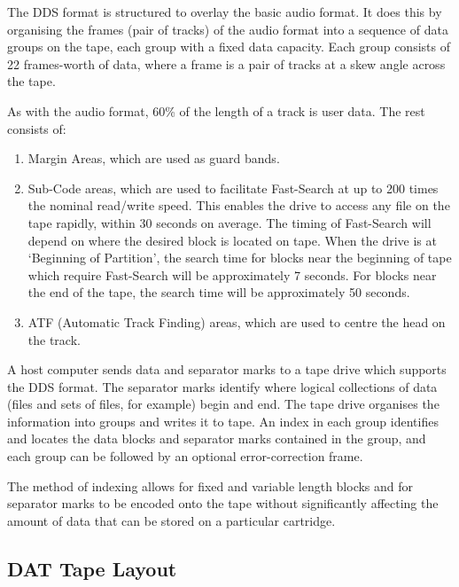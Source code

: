 \documentclass[11pt]{article}
\begin{document}
The DDS format is structured to overlay the basic audio format. It does this
by organising the frames (pair of tracks) of the audio format into a
sequence of data groups on the tape, each group with a fixed data capacity.
Each group consists of 22 frames-worth of data, where a frame is a pair of
tracks at a skew angle across the tape.

As with the audio format, 60\% of the length of a track is user data. The
rest consists of:

\begin {enumerate}

\item Margin Areas, which are used as guard bands.

\item Sub-Code areas, which are used to facilitate Fast-Search at up to 200
times the nominal read/write speed. This enables the drive to access any
file on the tape rapidly, within 30 seconds on average. The timing of
Fast-Search will depend on where the desired block is located on tape.
When the drive is at `Beginning of Partition', the search time for blocks
near the beginning of tape which require Fast-Search will be approximately
7 seconds. For blocks near the end of the tape, the search time will be
approximately 50 seconds.

\item ATF (Automatic Track Finding) areas, which are used to centre the head
on the track.

\end {enumerate}

A host computer sends data and separator marks to a tape drive which
supports the DDS format. The separator marks identify where logical
collections of data (files and sets of files, for example) begin and end.
The tape drive organises the information into groups and writes it to tape.
An index in each group identifies and locates the data blocks and separator
marks contained in the group, and each group can be followed by an optional
error-correction frame.

The method of indexing allows for fixed and variable length blocks and for
separator marks to be encoded onto the tape without significantly affecting
the amount of data that can be stored on a particular cartridge.

\subsection {DAT Tape Layout}
\end{document}
